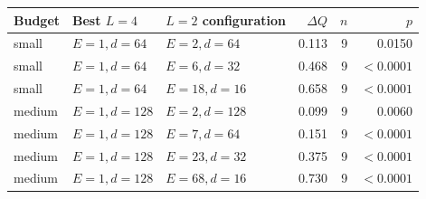 \documentclass[10pt]{article}
\begin{document}
\setcounter{table}{4}
\begin{center}
\small
\setlength{\tabcolsep}{5.0pt}
\begin{tabular}{@{}lllrrr@{}}
  \toprule
  Budget & Best \(L=4\) & \(L=2\) configuration & \(\Delta Q\) & \(n\) & \(p\) \\
  \midrule
  small & \(E=1,d=64\) & \(E=2,d=64\) & 0.113 & 9 & 0.0150 \\
  small & \(E=1,d=64\) & \(E=6,d=32\) & 0.468 & 9 & \(<0.0001\) \\
  small & \(E=1,d=64\) & \(E=18,d=16\) & 0.658 & 9 & \(<0.0001\) \\
  medium & \(E=1,d=128\) & \(E=2,d=128\) & 0.099 & 9 & 0.0060 \\
  medium & \(E=1,d=128\) & \(E=7,d=64\) & 0.151 & 9 & \(<0.0001\) \\
  medium & \(E=1,d=128\) & \(E=23,d=32\) & 0.375 & 9 & \(<0.0001\) \\
  medium & \(E=1,d=128\) & \(E=68,d=16\) & 0.730 & 9 & \(<0.0001\) \\
  \bottomrule
\end{tabular}
\end{center}
\vspace{0.5em}
\end{document}
